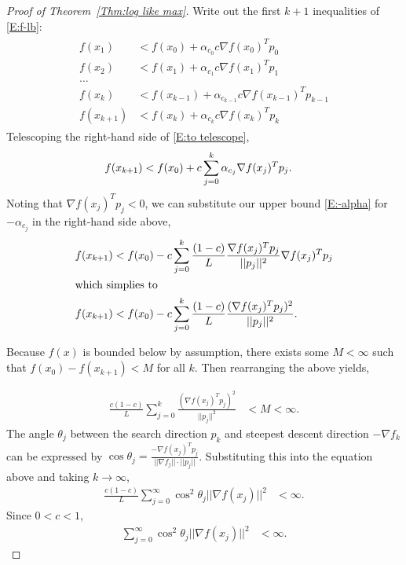 \begin{proof}[Proof of Theorem~\ref{Thm:log like max}]
Write out the first $k+1$ inequalities of \eqref{E:f-lb}:
\begin{align}
\begin{split}
	f( x_1 ) &< f(x_0) + \alpha_{c_0} c \nabla f(x_0)^T p_0 \\
	f( x_2 ) &< f(x_1) + \alpha_{c_1} c \nabla f(x_1)^T p_1  \\
	\ldots  \\
	f( x_{k} ) &< f(x_{k-1}) + \alpha_{c_{k-1}} c \nabla f(x_{k-1})^T p_{k-1}  \\
	f( x_{k+1} ) &< f(x_k) + \alpha_{c_k} c \nabla f(x_k)^T p_k 
\end{split}
	\label{E:to telescope}
\end{align}
Telescoping the right-hand side of \eqref{E:to telescope},
\begin{align*}
	f( x_{k+1} ) &< f(x_0) + c \sum_{j=0}^{k} \alpha_{c_j} \nabla f(x_j)^T p_j. \notag
\end{align*}
Noting that $\nabla f(x_j)^T p_j < 0$, we can substitute our upper bound 
\eqref{E:-alpha} for $-\alpha_{c_j}$ in the right-hand side above,
\begin{align}
	f( x_{k+1} ) &< f(x_0) - c \sum_{j=0}^{k} \frac{( 1 - c )}{L} 
	\frac{\nabla f(x_j)^T p_j}{ || p_j ||^2 } \nabla f(x_j)^T p_j \notag \\
	\intertext{which simplies to}
	f( x_{k+1} ) &< f(x_0) - c \sum_{j=0}^{k} \frac{( 1 - c )}{L} 
	\frac{ (\nabla f(x_j)^T p_j)^2}{ || p_j ||^2 }. 
\notag
\end{align}

Because $f(x)$ is bounded below by assumption, there exists some $M < \infty$ such 
that $f(x_0) - f(x_{k+1}) < M$ for 
all $k$. Then rearranging the above yields,

\begin{align*}
	\frac{c( 1 - c )}{L} \sum_{j=0}^{k}   
	\frac{ ( \nabla f(x_j)^T p_j )^2}{ || p_j ||^2 } &< M < \infty.
 \end{align*}
The angle $\theta_j$ between the search direction $p_k$ and steepest descent direction 
$-\nabla f_k$ can be expressed 
by $\cos \theta_j = \frac{ -\nabla f(x_j)^T p_j}{||\nabla f_j|| \cdot || p_j||}$.  
Substituting this into the equation 
above and taking $k \to \infty$,
\begin{align*}
	\frac{c( 1 - c )}{L} \sum_{j=0}^{\infty}  \cos^2 \theta_j ||\nabla f(x_j)||^2 &< \infty.
\end{align*}
Since $0 < c < 1$,
\begin{align}
	\sum_{j=0}^{\infty}  \cos^2 \theta_j ||\nabla f(x_j)||^2 &< \infty. \label{E:Z's}
\end{align}


\end{proof}
